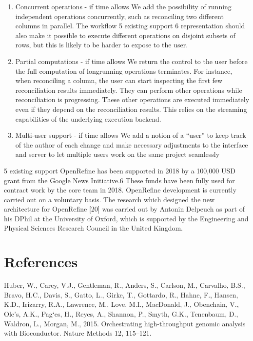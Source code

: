 \documentclass[]{elsarticle} %
\begin{document}
\begin{enumerate}
\item
  Concurrent operations - if time allows
  We add the possibility of running independent operations concurrently,
  such as reconciling two different columns in parallel. The workflow
  5 existing support 6
  representation should also make it possible to execute different operations on disjoint subsets of rows, but this is likely to be harder to
  expose to the user.
\item
  Partial computations - if time allows
  We return the control to the user before the full computation of longrunning operations terminates. For instance, when reconciling a column, the user can start inspecting the first few reconciliation results
  immediately. They can perform other operations while reconciliation
  is progressing. These other operations are executed immediately even
  if they depend on the reconciliation results. This relies on the streaming capabilities of the underlying execution backend.
\item
  Multi-user support - if time allows
  We add a notion of a ``user'' to keep track of the author of each change
  and make necessary adjustments to the interface and server to let multiple users work on the same project seamlessly
\end{enumerate}

5 existing support
OpenRefine has been supported in 2018 by a 100,000 USD grant from the
Google News Initiative.6 These funds have been fully used for contract work
by the core team in 2018. OpenRefine development is currently carried out
on a voluntary basis.
The research which designed the new architecture for OpenRefine {[}20{]}
was carried out by Antonin Delpeuch as part of his DPhil at the University
of Oxford, which is supported by the Engineering and Physical Sciences
Research Council in the United Kingdom.

\hypertarget{references}{%
\section*{References}\label{references}}

\hypertarget{refs}{}
\begin{cslreferences}
\leavevmode\hypertarget{ref-bioconductor}{}%
Huber, W., Carey, V.J., Gentleman, R., Anders, S., Carlson, M., Carvalho, B.S., Bravo, H.C., Davis, S., Gatto, L., Girke, T., Gottardo, R., Hahne, F., Hansen, K.D., Irizarry, R.A., Lawrence, M., Love, M.I., MacDonald, J., Obenchain, V., Ole's, A.K., Pag`es, H., Reyes, A., Shannon, P., Smyth, G.K., Tenenbaum, D., Waldron, L., Morgan, M., 2015. Orchestrating high-throughput genomic analysis with Bioconductor. Nature Methods 12, 115--121.
\end{cslreferences}
\end{document}
